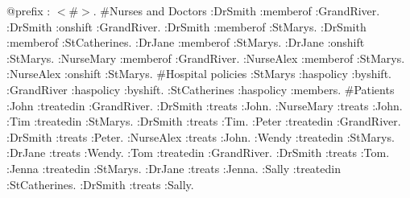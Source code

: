 \documentclass[conference]{IEEEtran}
\begin{document}
@prefix : $<\#>$. \newline
\newline
\#Nurses and Doctors \newline
:DrSmith :memberof :GrandRiver.\newline
:DrSmith :onshift :GrandRiver.\newline
:DrSmith :memberof :StMarys.\newline
:DrSmith :memberof :StCatherines.\newline
\newline
:DrJane :memberof :StMarys.\newline
:DrJane :onshift :StMarys.\newline
\newline
:NurseMary :memberof :GrandRiver.\newline
:NurseAlex :memberof :StMarys.\newline
:NurseAlex :onshift :StMarys.\newline
\newline
\#Hospital policies\newline
:StMarys :haspolicy :byshift.\newline
:GrandRiver :haspolicy :byshift.\newline
:StCatherines :haspolicy :members.\newline
\newline
\#Patients\newline
:John :treatedin :GrandRiver.\newline
:DrSmith :treats :John.\newline
:NurseMary :treats :John.\newline
:Tim :treatedin :StMarys.\newline
:DrSmith :treats :Tim.\newline
:Peter :treatedin :GrandRiver.\newline
:DrSmith :treats :Peter.\newline
:NurseAlex :treats :John.\newline
:Wendy :treatedin :StMarys.\newline
:DrJane :treats :Wendy.\newline
:Tom :treatedin :GrandRiver.\newline
:DrSmith :treats :Tom.\newline
:Jenna :treatedin :StMarys.\newline
:DrJane :treats :Jenna.\newline
:Sally :treatedin :StCatherines.\newline
:DrSmith :treats :Sally.\newline
\end{document}

